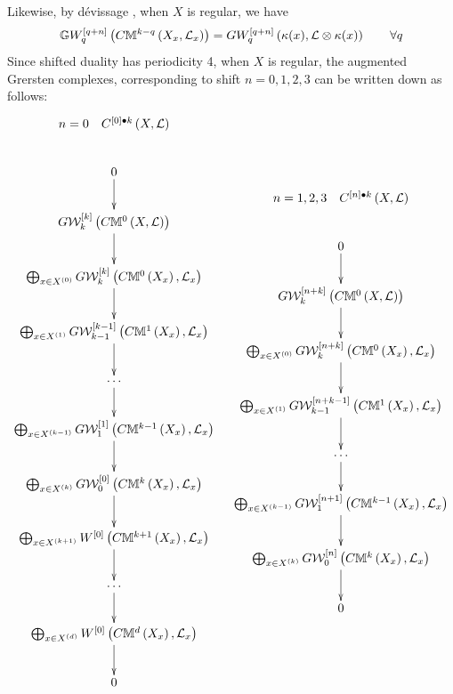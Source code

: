 \documentclass[12pt]{article}
\begin{document}
Likewise, by d\'{e}vissage \cite[Thm 6.1]{M25}, when $X$ is regular, we have
$$
{\mathbb{G}}W_q^{\left[ q+n\right]}\left( C{\mathbb{M}}^{k-q}\left( X_x, {\mathcal{L}}_x\right)\right) = GW_q^{\left[ q+n\right]}\left( \kappa(x), {\mathcal{L}}\otimes\kappa(x)\right)\qquad \forall q
$$
Since shifted duality has periodicity 4, when $X$ is regular,  the augmented Grersten complexes, corresponding to shift $n=0, 1, 2, 3$ can be written down as follows:%
\begin{equation}\label{TzwiGerK}
\diagram
n=0\quad C^{\LRt{0}{\bul}k}\LRf{X, {\CL}}\\
0 \ar[d]\\
 G{\CW}^{\LRt{k}}_k\LRf{C{\BM}^0\LRf{X, {\CL}}}\ar[d]\\
\bigoplus_{x\in X^{\LRf{0}}}G{\CW}^{\LRt{k}}_k\LRf{C{\BM}^0\LRf{X_x}, {\CL}_x}\ar[d]\\
\bigoplus_{x\in X^{\LRf{1}}}G{\CW}^{\LRt{k-1}}_{k-1}\LRf{C{\BM}^1\LRf{X_x}, {\CL}_x}\ar[d]\\
\cdots\ar[d]\\
\bigoplus_{x\in X^{\LRf{k-1}}}G{\CW}^{\LRt{1}}_{1}\LRf{C{\BM}^{k-1}\LRf{X_x}, {\CL}_x}\ar[d] \\
%
\bigoplus_{x\in X^{\LRf{k}}}G{\CW}^{\LRt{0}}_{0}\LRf{C{\BM}^k\LRf{X_x}, {\CL}_x}\ar[d]\\ %
% 
\bigoplus_{x\in X^{\LRf{k+1}}}W^{\LRt{0}}\LRf{C{\BM}^{k+1}\LRf{X_x}, {\CL}_x} \ar[d]\\
%
\cdots\ar[d]\\
\bigoplus_{x\in X^{\LRf{d}}}W^{\LRt{0}}\LRf{C{\BM}^d\LRf{X_x},  {\CL}_x} \ar[d] \\
0\\
\enddiagram
\quad 
\diagram
n=1, 2, 3 \quad C^{\LRt{n}{\bul}k}\LRf{X, {\CL}}\\
0 \ar[d]\\
 G{\CW}^{\LRt{n+k}}_k\LRf{C{\BM}^0\LRf{X, {\CL}}}\ar[d]\\
\bigoplus_{x\in X^{\LRf{0}}}G{\CW}^{\LRt{n+k}}_k\LRf{C{\BM}^0\LRf{X_x}, {\CL}_x}\ar[d]\\
\bigoplus_{x\in X^{\LRf{1}}}G{\CW}^{\LRt{n+k-1}}_{k-1}\LRf{C{\BM}^1\LRf{X_x}, {\CL}_x}\ar[d]\\
\cdots\ar[d]\\
\bigoplus_{x\in X^{\LRf{k-1}}}G{\CW}^{\LRt{n+1}}_{1}\LRf{C{\BM}^{k-1}\LRf{X_x}, {\CL}_x}\ar[d] \\
%
\bigoplus_{x\in X^{\LRf{k}}}G{\CW}^{\LRt{n}}_{0}\LRf{C{\BM}^k\LRf{X_x}, {\CL}_x}\ar[d]\\ %
% 
0\\
\enddiagram
\end{equation}
\end{document}
